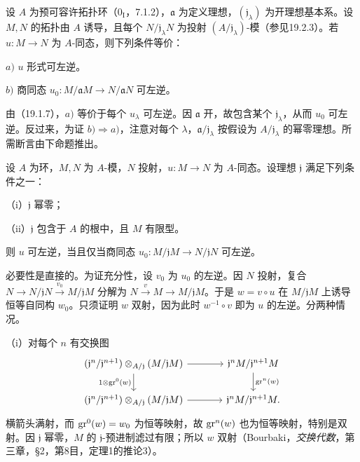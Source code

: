 设 $A$ 为预可容许拓扑环（$0_{\mathrm I}$，7.1.2），$\mathfrak a$ 为定义理想，$(\mathfrak j_\lambda)$ 为开理想基本系。设 $M,N$ 的拓扑由 $A$ 诱导，且每个 $N/\mathfrak j_\lambda N$ 为投射 $(A/\mathfrak j_\lambda)$-模（参见19.2.3）。若 $u:M\to N$ 为 $A$-同态，则下列条件等价：

$a)$ $u$ 形式可左逆。

$b)$ 商同态 $u_0:M/\mathfrak aM\to N/\mathfrak aN$ 可左逆。

由（19.1.7），$a)$ 等价于每个 $u_\lambda$ 可左逆。因 $\mathfrak a$ 开，故包含某个 $\mathfrak j_\lambda$，从而 $u_0$ 可左逆。反过来，为证 $b)\Rightarrow a)$，注意对每个 $\lambda$，$\mathfrak a/\mathfrak j_\lambda$ 按假设为 $A/\mathfrak j_\lambda$ 的幂零理想。所需断言由下命题推出。

设 $A$ 为环，$M,N$ 为 $A$-模，$N$ 投射，$u:M\to N$ 为 $A$-同态。设理想 $\mathfrak j$ 满足下列条件之一：

（i）$\mathfrak j$ 幂零；

（ii）$\mathfrak j$ 包含于 $A$ 的根中，且 $M$ 有限型。

则 $u$ 可左逆，当且仅当商同态 $u_0:M/\mathfrak jM\to N/\mathfrak jN$ 可左逆。

必要性是直接的。为证充分性，设 $v_0$ 为 $u_0$ 的左逆。因 $N$ 投射，复合 $N\to N/\mathfrak jN\xrightarrow{v_0}M/\mathfrak jM$ 分解为 $N\xrightarrow{v}M\to M/\mathfrak jM$。于是 $w=v\circ u$ 在 $M/\mathfrak jM$ 上诱导恒等自同构 $w_0$。只须证明 $w$ 双射，因为此时 $w^{-1}\circ v$ 即为 $u$ 的左逆。分两种情况。

（i）对每个 $n$ 有交换图
\[
\begin{tikzcd}[column sep=large]
 (\mathfrak j^n/\mathfrak j^{n+1})\otimes_{A/\mathfrak j}(M/\mathfrak jM)
 \arrow[r]\arrow[d,"1\otimes\gr^0(w)"']&\mathfrak j^nM/\mathfrak j^{n+1}M\arrow[d,"\gr^n(w)"]\\
 (\mathfrak j^n/\mathfrak j^{n+1})\otimes_{A/\mathfrak j}(M/\mathfrak jM)
 \arrow[r]&\mathfrak j^nM/\mathfrak j^{n+1}M.
\end{tikzcd}
\]
横箭头满射，而 $\operatorname{gr}^0(w)=w_0$ 为恒等映射，故 $\operatorname{gr}^n(w)$ 也为恒等映射，特别是双射。因 $\mathfrak j$ 幂零，$M$ 的 $\mathfrak j$-预进制滤过有限；所以 $w$ 双射（Bourbaki，\textit{交换代数}，第三章，§2，第8目，定理1的推论3）。

